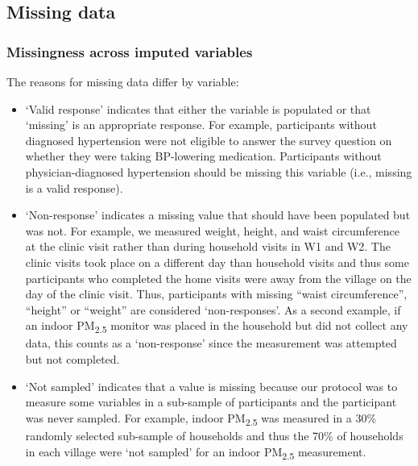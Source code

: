 \documentclass[
  letterpaper,
  DIV=11,
  numbers=noendperiod]{scrartcl}
\begin{document}
\newpage

\subsection{Missing data}\label{missing-data}

\subsubsection{Missingness across imputed
variables}\label{missingness-across-imputed-variables}

The reasons for missing data differ by variable:

\begin{itemize}
\item
  `Valid response' indicates that either the variable is populated or
  that `missing' is an appropriate response. For example, participants
  without diagnosed hypertension were not eligible to answer the survey
  question on whether they were taking BP-lowering medication.
  Participants without physician-diagnosed hypertension should be
  missing this variable (i.e., missing is a valid response).
\item
  `Non-response' indicates a missing value that should have been
  populated but was not. For example, we measured weight, height, and
  waist circumference at the clinic visit rather than during household
  visits in W1 and W2. The clinic visits took place on a different day
  than household visits and thus some participants who completed the
  home visits were away from the village on the day of the clinic visit.
  Thus, participants with missing ``waist circumference'', ``height'' or
  ``weight'' are considered `non-responses'. As a second example, if an
  indoor PM\textsubscript{2.5} monitor was placed in the household but
  did not collect any data, this counts as a `non-response' since the
  measurement was attempted but not completed.
\item
  `Not sampled' indicates that a value is missing because our protocol
  was to measure some variables in a sub-sample of participants and the
  participant was never sampled. For example, indoor
  PM\textsubscript{2.5} was measured in a 30\% randomly selected
  sub-sample of households and thus the 70\% of households in each
  village were `not sampled' for an indoor PM\textsubscript{2.5}
  measurement.
\end{itemize}
\end{document}
